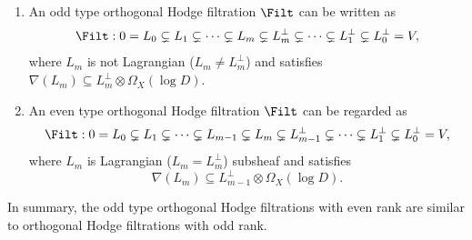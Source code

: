 \skpt
\begin{rem}
\begin{enumerate}
\item An odd type orthogonal Hodge filtration $\Filt$ can be written as
\[
\Filt: 0= L_0 \subsetneq L_1 \subsetneq \cdots \subsetneq L_m \subsetneq L_m^\perp\subsetneq\cdots \subsetneq L_1^\perp\subsetneq L_0^\perp= V,
\]
where $L_m$ is not Lagrangian (\ie $L_m\neq L_m^\perp$) and satisfies $\nabla(L_m)\subseteq L_m^\perp \otimes\Omega_X(\log D)$.

\item An even type orthogonal Hodge filtration $\Filt$ can be regarded as
\[
\Filt: 0= L_0 \subsetneq L_1 \subsetneq \cdots\subsetneq L_{m-1} \subsetneq L_m \subsetneq L_{m-1}^\perp\subsetneq\cdots \subsetneq L_1^\perp\subsetneq L_0^\perp= V,
\]
where $L_m$ is Lagrangian (\ie $L_m= L_m^\perp$) subsheaf and satisfies
\[
\nabla(L_m)\subseteq L_{m-1}^\perp \otimes\Omega_X(\log D).
\]
\end{enumerate}
In summary, the odd type orthogonal Hodge filtrations with even rank are similar to orthogonal Hodge filtrations with odd rank.
\end{rem}


